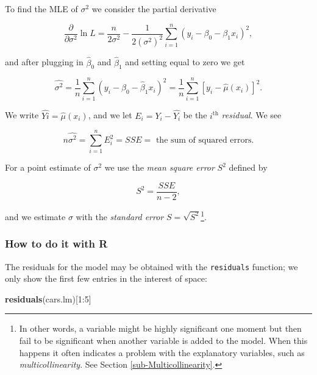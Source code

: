 \documentclass[]{book}
\newenvironment{Shaded}{\begin{snugshade}}{\end{snugshade}}
\newcommand{\KeywordTok}[1]{\textcolor[rgb]{0.13,0.29,0.53}{\textbf{{#1}}}}
\newcommand{\DecValTok}[1]{\textcolor[rgb]{0.00,0.00,0.81}{{#1}}}
\newcommand{\NormalTok}[1]{{#1}}
\let\rmarkdownfootnote\footnote%
\def\footnote{\protect\rmarkdownfootnote}
\numberwithin{equation}{chapter}
\numberwithin{figure}{chapter}
\theoremstyle{plain}
\theoremstyle{definition}
\theoremstyle{remark}
\theoremstyle{definition}
\theoremstyle{definition}
\theoremstyle{remark}
\begin{document}
To find the MLE of \(\sigma^{2}\) we consider the partial derivative

\begin{equation}
\frac{\partial}{\partial\sigma^{2}}\ln L=\frac{n}{2\sigma^{2}}-\frac{1}{2(\sigma^{2})^{2}}\sum_{i=1}^{n}(y_{i}-\beta_{0}-\beta_{1}x_{i})^{2},
\end{equation}

and after plugging in \(\hat{\beta}_{0}\) and \(\hat{\beta}_{1}\) and
setting equal to zero we get

\begin{equation}
\hat{\sigma^{2}}=\frac{1}{n}\sum_{i=1}^{n}(y_{i}-\hat{\beta}_{0}-\hat{\beta}_{1}x_{i})^{2}=\frac{1}{n}\sum_{i=1}^{n}[y_{i}-\hat{\mu}(x_{i})]^{2}.
\end{equation}

We write \(\hat{Yi}=\hat{\mu}(x_{i})\), and we let
\(E_{i}=Y_{i}-\hat{Y_{i}}\) be the \(i^{\mathrm{th}}\) \emph{residual}.
We see

\begin{equation}
n\hat{\sigma^{2}}=\sum_{i=1}^{n}E_{i}^{2}=SSE=\mbox{ the sum of squared errors.}
\end{equation}

For a point estimate of \(\sigma^{2}\) we use the \emph{mean square
error} \(S^{2}\) defined by

\begin{equation}
S^{2}=\frac{SSE}{n-2},
\end{equation}

and we estimate \(\sigma\) with the \emph{standard error}
\(S=\sqrt{S^{2}}\)\footnote{In other words, a variable might be highly
  significant one moment but then fail to be significant when another
  variable is added to the model. When this happens it often indicates a
  problem with the explanatory variables, such as
  \emph{multicollinearity}. See Section \ref{sub-Multicollinearity}.}.

\subsubsection{How to do it with R}\label{how-to-do-it-with-r-22}

The residuals for the model may be obtained with the \texttt{residuals}
function; we only show the first few entries in the interest of space:

\begin{Shaded}
\begin{Highlighting}[]
\KeywordTok{residuals}\NormalTok{(cars.lm)[}\DecValTok{1}\NormalTok{:}\DecValTok{5}\NormalTok{]}
\end{Highlighting}
\end{Shaded}
\end{document}
